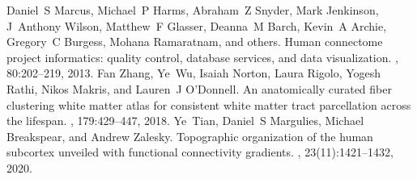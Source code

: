 \documentclass[letterpaper,10pt,english]{jupyterBook}
\begin{document}
\begin{sphinxthebibliography}{10}
\sphinxAtStartPar
Daniel S Marcus, Michael P Harms, Abraham Z Snyder, Mark Jenkinson, J Anthony Wilson, Matthew F Glasser, Deanna M Barch, Kevin A Archie, Gregory C Burgess, Mohana Ramaratnam, and others. Human connectome project informatics: quality control, database services, and data visualization. , 80:202–219, 2013.
\sphinxAtStartPar
Fan Zhang, Ye Wu, Isaiah Norton, Laura Rigolo, Yogesh Rathi, Nikos Makris, and Lauren J O'Donnell. An anatomically curated fiber clustering white matter atlas for consistent white matter tract parcellation across the lifespan. , 179:429–447, 2018.
\sphinxAtStartPar
Ye Tian, Daniel S Margulies, Michael Breakspear, and Andrew Zalesky. Topographic organization of the human subcortex unveiled with functional connectivity gradients. , 23(11):1421–1432, 2020.
\end{sphinxthebibliography}







\renewcommand{\indexname}{Index}
\printindex
\end{document}
